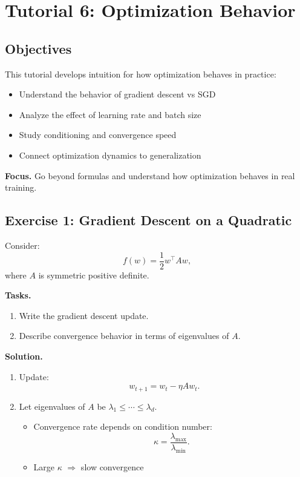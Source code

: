 \section{Tutorial 6: Optimization Behavior}

\subsection{Objectives}

This tutorial develops intuition for how optimization behaves in practice:

\begin{itemize}
    \item Understand the behavior of gradient descent vs SGD
    \item Analyze the effect of learning rate and batch size
    \item Study conditioning and convergence speed
    \item Connect optimization dynamics to generalization
\end{itemize}

\medskip

\noindent
\textbf{Focus.}  
Go beyond formulas and understand how optimization behaves in real training.

\subsection{Exercise 1: Gradient Descent on a Quadratic}

Consider:
\[
f(w) = \frac{1}{2} w^\top A w,
\]
where $A$ is symmetric positive definite.

\medskip

\noindent
\textbf{Tasks.}
\begin{enumerate}
    \item Write the gradient descent update.
    \item Describe convergence behavior in terms of eigenvalues of $A$.
\end{enumerate}

\medskip

\noindent
\textbf{Solution.}

\begin{enumerate}
\item Update:
\[
w_{t+1} = w_t - \eta A w_t.
\]

\item Let eigenvalues of $A$ be $\lambda_1 \leq \cdots \leq \lambda_d$.

\begin{itemize}
    \item Convergence rate depends on condition number:
    \[
    \kappa = \frac{\lambda_{\max}}{\lambda_{\min}}.
    \]
    \item Large $\kappa$ $\Rightarrow$ slow convergence
\end{itemize}
\end{enumerate}


